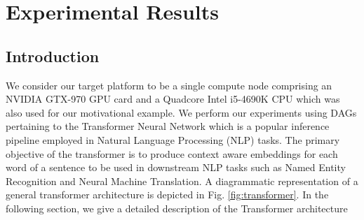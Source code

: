 
\chapter{Experimental Results} %

\label{Chapter6} %


\section{Introduction}
    We consider our target platform to be a single compute node comprising an NVIDIA GTX-970 GPU card and a Quadcore Intel i5-4690K CPU which was also used for our motivational example. We perform our experiments using DAGs pertaining to the Transformer Neural Network \cite{DBLP:journals/corr/VaswaniSPUJGKP17} which is a popular inference pipeline employed in Natural Language Processing (NLP) tasks. The primary objective of the transformer is to produce context aware embeddings for each word of a sentence to be used in downstream NLP tasks such as Named Entity Recognition and Neural Machine Translation. A diagrammatic representation of a general transformer architecture is depicted in Fig. \ref{fig:transformer}. In the following section, we give a detailed description of the Transformer architecture
